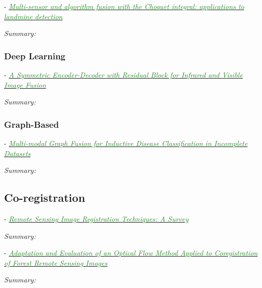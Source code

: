 \documentclass[]{article}
\newcommand{\paperentry}[4]{
            \hangindent=1cm
            \cite{#1} - \href{run:../References/#3}{\textcolor{ForestGreen}{\textit{#2}}}
            
            \noindent            
            \begin{minipage}[t]{0.1\linewidth}\hfill\end{minipage}
            \begin{minipage}[t]{0.8\linewidth}\textcolor{NavyBlue}{{\textit{Summary:}}}#4\end{minipage}
            \vspace{.25cm}
          }
\begin{document}
			\paperentry{Gader2004ChoquetIntegralLandmine}
			{Multi-sensor and algorithm fusion with the Choquet integral: applications to landmine detection}
			{Fusion/Choquet/Gader2004ChoquetIntegralLandmine.pdf}
			{}
			
			
			
		
		\subsubsection{Deep Learning}
		
			\paperentry{Jian2019AEInfraredVisibleFusion}
			{A Symmetric Encoder-Decoder with Residual Block for Infrared and Visible Image Fusion}
			{Fusion/DeepLearning/Jian2019AEInfraredVisibleFusion.pdf}
			{}
		
		\subsubsection{Graph-Based}
		
			\paperentry{Vivar2019MultiModalGraphFusion}
			{Multi-modal Graph Fusion for Inductive Disease Classification in Incomplete Datasets}
			{Fusion/GraphBased/Vivar2019MultiModalGraphFusion.pdf}
			{}

	\subsection{Co-registration}
	
		\paperentry{Dawn2010SurveyRemoteSensingImageRegistration}
		{Remote Sensing Image Registration Techniques: A Survey}
		{Fusion/Dawn2010SurveyRemoteSensingImageRegistration.pdf}
		{}
	
		\paperentry{Brigot2016CoregistrationForestRemoteSensingImages}
		{Adaptation and Evaluation of an Optical Flow Method Applied to Coregistration of Forest Remote Sensing Images}
		{Fusion/Brigot2016CoregistrationForestRemoteSensingImages.pdf}
		{}
		
\end{document}

